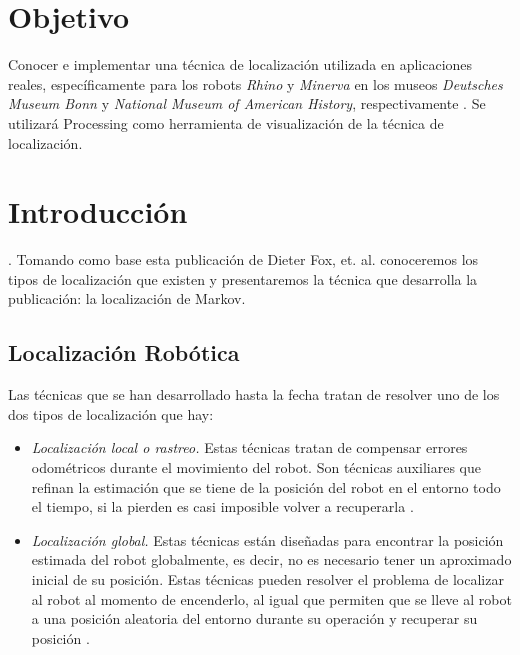 \section{Objetivo}
Conocer e implementar una técnica de localización utilizada en aplicaciones reales, específicamente para los robots \textit{Rhino} y \textit{Minerva} en los museos \textit{Deutsches Museum Bonn} y \textit{National Museum of American History}, respectivamente \parencite{Dieter1999}. Se utilizará Processing como herramienta de visualización de la técnica de localización.

\section{Introducci\'on}

 \parencite{Dieter1999}. Tomando como base esta publicación de Dieter Fox, et. al. conoceremos los tipos de localización que existen y presentaremos la técnica que desarrolla la publicación: la localización de Markov.

\subsection{Localización Robótica}

Las técnicas que se han desarrollado hasta la fecha tratan de resolver uno de los dos tipos de localización que hay:

\begin{itemize}
  \item \textit{Localización local o rastreo.} Estas técnicas tratan de compensar errores odométricos durante el movimiento del robot. Son técnicas auxiliares que refinan la estimación que se tiene de la posición del robot en el entorno todo el tiempo, si la pierden es casi imposible volver a recuperarla \parencite{Dieter1999}.
  \item \textit{Localización global.} Estas técnicas están diseñadas para encontrar la posición estimada del robot globalmente, es decir, no es necesario tener un aproximado inicial de su posición. Estas técnicas pueden resolver el problema de localizar al robot al momento de encenderlo, al igual que permiten que se lleve al robot a una posición aleatoria del entorno durante su operación y recuperar su posición \parencite{Dieter1999}.
\end{itemize}

